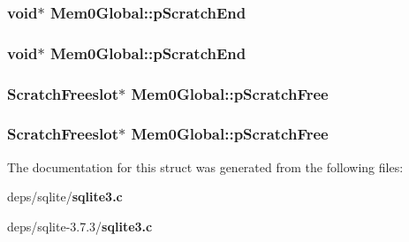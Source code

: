 \subsubsection{\setlength{\rightskip}{0pt plus 5cm}void$\ast$ \bf{Mem0Global::p\-Scratch\-End}}\label{structMem0Global_eba8536d591a47ee0b774797a60e0f10}


\subsubsection{\setlength{\rightskip}{0pt plus 5cm}void$\ast$ \bf{Mem0Global::p\-Scratch\-End}}\label{structMem0Global_eba8536d591a47ee0b774797a60e0f10}


\subsubsection{\setlength{\rightskip}{0pt plus 5cm}\bf{Scratch\-Freeslot}$\ast$ \bf{Mem0Global::p\-Scratch\-Free}}\label{structMem0Global_a05d9d4c34e6ed98b0750a44f8fb85c5}


\subsubsection{\setlength{\rightskip}{0pt plus 5cm}\bf{Scratch\-Freeslot}$\ast$ \bf{Mem0Global::p\-Scratch\-Free}}\label{structMem0Global_a05d9d4c34e6ed98b0750a44f8fb85c5}




The documentation for this struct was generated from the following files:\begin{CompactItemize}
\item 
deps/sqlite/\bf{sqlite3.c}\item 
deps/sqlite-3.7.3/\bf{sqlite3.c}\end{CompactItemize}
